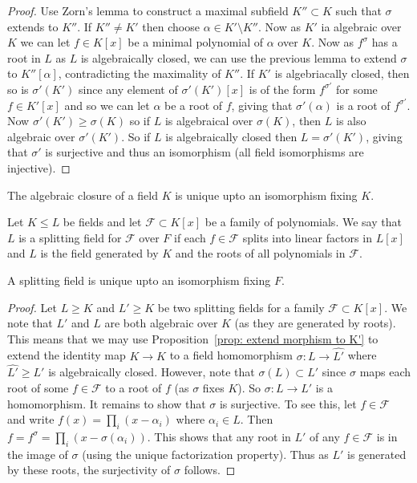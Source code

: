 \documentclass[twoside, a4paper, 10pt]{amsart}
\begin{document}
\begin{proof} Use Zorn's lemma to construct a maximal subfield $K'' \subset K$ such that $\sigma$ extends to $K''$. If $K'' \neq K'$ then choose $\alpha \in K' \setminus K''$. Now as $K'$ ia algebraic over $K$ we can let $f \in K[x]$ be a minimal polynomial of $\alpha$ over $K$. Now as $f^{\sigma}$ has a root in $L$ as $L$ is algebraically closed, we can use the previous lemma to extend $\sigma$ to $K''[\alpha]$, contradicting the maximality of $K''$. If $K'$ is algebriacally closed, then so is $\sigma'(K')$ since any element of $\sigma'(K')[x]$ is of the form $f^{\sigma'}$ for some $f \in K'[x]$ and so we can let $\alpha$ be a root of $f$, giving that $\sigma'(\alpha)$ is a root of $f^{\sigma'}$. Now $\sigma'(K') \geq \sigma(K)$ so if $L$ is algebraical over $\sigma(K)$, then $L$ is also algebraic over $\sigma'(K')$. So if $L$ is algebraically closed then $L = \sigma'(K')$, giving that $\sigma'$ is surjective and thus an isomorphism (all field isomorphisms are injective). \end{proof}

\begin{corol} The algebraic closure of a field $K$ is unique upto an isomorphism fixing $K$.

\end{corol}

\begin{mydef} Let $K \leq L$ be fields and let $\mathcal{F} \subset K[x]$ be a family of polynomials. We say that $L$ is a splitting field for $\mathcal{F}$ over $F$ if each $f \in \mathcal{F}$ splits into linear factors in $L[x]$ and $L$ is the field generated by $K$ and the roots of all polynomials in $\mathcal{F}$.

\end{mydef}

\begin{prop} A splitting field is unique upto an isomorphism fixing $F$.

\end{prop}

\begin{proof} Let $L \geq K$ and $L' \geq K$ be two splitting fields for a family $\mathcal{F} \subset K[x]$. We note that $L'$ and $L$ are both algebraic over $K$ (as they are generated by roots). This means that we may use Proposition~\ref{prop: extend morphism to K'} to extend the identity map $K \to K$ to a field homomorphism $\sigma:L \to \widehat{L'}$ where $\widehat{L'} \geq L'$ is algebraically closed. However, note that $\sigma(L) \subset L'$ since $\sigma$ maps each root of some $f \in \mathcal{F}$ to a root of $f$ (as $\sigma$ fixes $K$). So $\sigma:L \to L'$ is a homomorphism. It remains to show that $\sigma$ is surjective. To see this, let $f \in \mathcal{F}$ and write $f(x) = \prod_i (x - \alpha_i)$ where $\alpha_i \in L$. Then $f = f^{\sigma} = \prod_i(x - \sigma(\alpha_i))$. This shows that any root in $L'$ of any $f \in \mathcal{F}$ is in the image of $\sigma$ (using the unique factorization property). Thus as $L'$ is generated by these roots, the surjectivity of $\sigma$ follows. \end{proof}
\end{document}

